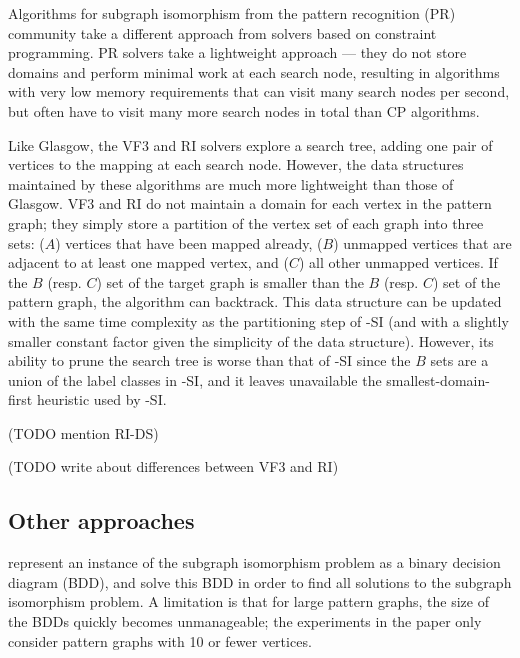 Algorithms for subgraph isomorphism from the pattern recognition (PR) community
take a different approach from solvers based on constraint programming.  PR
solvers take a lightweight approach --- they do not store domains and perform
minimal work at each search node, resulting in algorithms with very low memory
requirements that can visit many search nodes per second, but often have to
visit many more search nodes in total than CP algorithms.

Like Glasgow, the VF3 \cite{DBLP:journals/pami/CarlettiFSV18} and RI
\cite{DBLP:journals/bmcbi/BonniciGPSF13,DBLP:journals/tcbb/BonniciG17}
solvers explore a search tree, adding one pair of vertices to the mapping at each
search node.  However, the data structures maintained by these algorithms are
much more lightweight than those of Glasgow.  VF3 and RI do not maintain
a domain for each vertex in the pattern graph; they simply store a partition
of the vertex set of each graph into three sets: ($A$) vertices that have been
mapped already, ($B$) unmapped vertices that are adjacent to at least one mapped vertex, and
($C$) all other unmapped vertices.
If the $B$ (resp. $C$) set of the target graph is smaller than the $B$ (resp. $C$)
set of the pattern graph, the algorithm can backtrack.
This data structure can be updated with the same
time complexity as the partitioning step of \McSplit-SI (and with a slightly
smaller constant factor given the simplicity of the data structure).  
However, its ability to prune the search tree is worse than that of \McSplit-SI
since the $B$ sets are a union of the label classes in \McSplit-SI, and it
leaves unavailable the smallest-domain-first heuristic used by \McSplit-SI.

(TODO mention RI-DS)

(TODO write about differences between VF3 and RI)

\subsection{Other approaches}

\citet{DBLP:conf/RelMiCS/CortadellaV00} represent an instance of the subgraph
isomorphism problem as a binary decision diagram (BDD), and solve this BDD
in order to find all solutions to the subgraph isomorphism problem.  A limitation
is that for large
pattern graphs, the size of the BDDs quickly becomes unmanageable; the experiments
in the paper only consider pattern graphs with 10 or fewer vertices.

